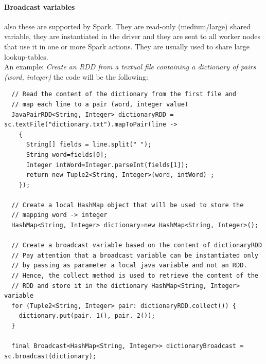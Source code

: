 \documentclass[12pt]{article}
\begin{document}
\paragraph{Broadcast variables} also these are supported by Spark. They are read-only (medium/large) shared variable, they are instantiated in the driver and they are sent to all worker nodes that use it in one or more Spark actions. They are usually used to share large lookup-tables.\\
An example: \textit{Create an RDD from a textual file containing a dictionary of pairs (word, integer)} the code will be the following:
\begin{lstlisting}
  // Read the content of the dictionary from the first file and
  // map each line to a pair (word, integer value)
  JavaPairRDD<String, Integer> dictionaryRDD = sc.textFile("dictionary.txt").mapToPair(line ->
    {
      String[] fields = line.split(" ");
      String word=fields[0];
      Integer intWord=Integer.parseInt(fields[1]);
      return new Tuple2<String, Integer>(word, intWord) ;
    });

  // Create a local HashMap object that will be used to store the
  // mapping word -> integer
  HashMap<String, Integer> dictionary=new HashMap<String, Integer>();

  // Create a broadcast variable based on the content of dictionaryRDD
  // Pay attention that a broadcast variable can be instantiated only
  // by passing as parameter a local java variable and not an RDD.
  // Hence, the collect method is used to retrieve the content of the
  // RDD and store it in the dictionary HashMap<String, Integer> variable
  for (Tuple2<String, Integer> pair: dictionaryRDD.collect()) {
    dictionary.put(pair._1(), pair._2());
  }

  final Broadcast<HashMap<String, Integer>> dictionaryBroadcast = sc.broadcast(dictionary);
\end{lstlisting}
\end{document}

